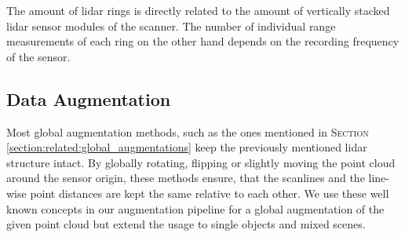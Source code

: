 \documentclass[letterpaper, 10 pt, conference]{ieeeconf}
\begin{document}
The amount of lidar rings is directly related to the amount of vertically stacked lidar sensor modules of the scanner. The number of individual range measurements of each ring on the other hand depends on the recording frequency of the sensor. 



\subsection{Data Augmentation}
\label{section:method:augmentation}
Most global augmentation methods, such as the ones mentioned in \textsc{Section} \ref{section:related:global_augmentations} keep the previously mentioned lidar structure intact.
By globally rotating, flipping or slightly moving the point cloud around the sensor origin, these methods ensure, that the scanlines and the line-wise point distances are kept the same relative to each other. We use these well known concepts in our augmentation pipeline for a global augmentation of the given point cloud but extend the usage to single objects and mixed scenes.
\end{document}
